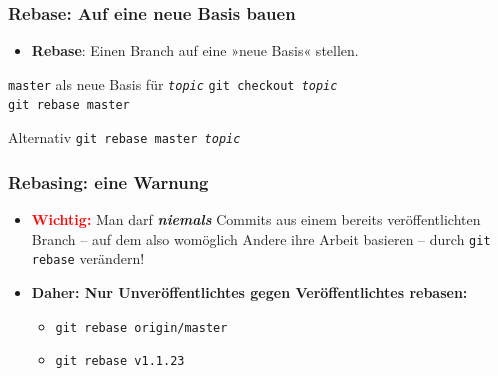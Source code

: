 \documentclass{beamer}
\begin{document}
\begin{frame}
 \frametitle{Rebase: Auf eine neue Basis bauen}
  


\begin{itemize}
  \item \textbf{Rebase}: Einen Branch auf eine »neue Basis« stellen.
\end{itemize}
\begin{block}{\texttt{master} als neue Basis für \texttt{\emph{topic}}}
\texttt{git checkout \emph{topic}} \\
\texttt{git rebase master}
\end{block}

\begin{block}{Alternativ}
\texttt{git rebase master \emph{topic}}
\end{block}

  
 \end{frame}
\begin{frame}
 \frametitle{Rebasing: eine Warnung}
  


\begin{itemize}
  \item \textcolor{red}{\textbf{Wichtig:}} Man darf \textbf{\emph{niemals}} Commits aus einem bereits veröffentlichten Branch -- auf dem also womöglich Andere ihre Arbeit basieren -- durch \texttt{git rebase} verändern!
  \item \textbf{Daher: Nur Unveröffentlichtes gegen Veröffentlichtes rebasen:}
\begin{itemize}
  \item \texttt{git rebase origin/master}
  \item \texttt{git rebase v1.1.23}
\end{itemize}
\end{itemize}

  
 \end{frame}
\end{document}
